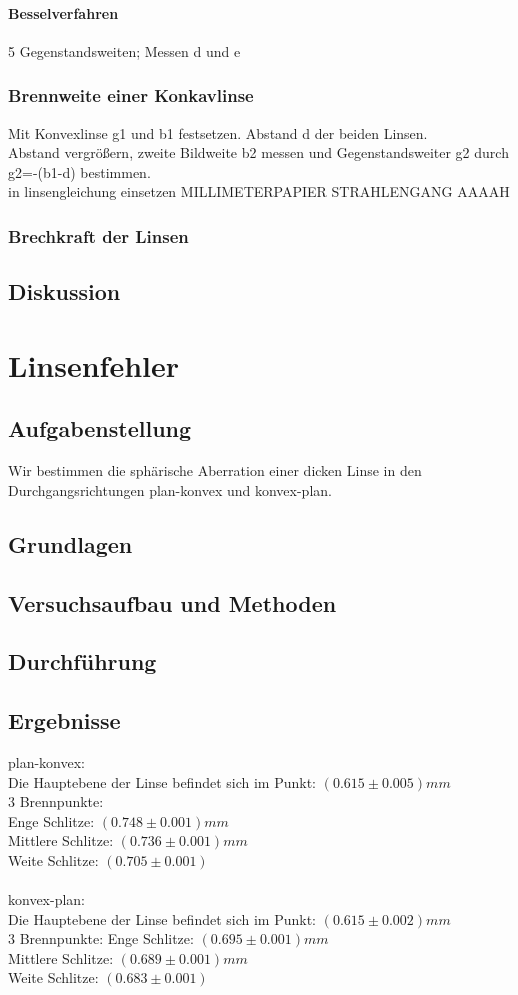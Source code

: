 \documentclass{article}
\begin{document}
\paragraph{Besselverfahren}
5 Gegenstandsweiten; Messen d und e
\subsubsection*{Brennweite einer Konkavlinse}
Mit Konvexlinse g1 und b1 festsetzen. Abstand d der beiden Linsen. \\
Abstand vergrößern, zweite Bildweite b2 messen und Gegenstandsweiter g2 durch g2=-(b1-d) bestimmen.\\
in linsengleichung einsetzen
MILLIMETERPAPIER STRAHLENGANG AAAAH
\subsubsection*{Brechkraft der Linsen}
\subsection{Diskussion}

\section{Linsenfehler}

\subsection{Aufgabenstellung}
Wir bestimmen die sphärische Aberration einer dicken Linse in den Durchgangsrichtungen plan-konvex und konvex-plan.
\subsection{Grundlagen}
\subsection{Versuchsaufbau und Methoden}
\subsection{Durchführung}
\subsection{Ergebnisse}
plan-konvex:\\
Die Hauptebene der Linse befindet sich im Punkt: $(0.615 \pm 0.005)mm$\\
3 Brennpunkte:\\
Enge Schlitze: $(0.748 \pm 0.001)mm$\\
Mittlere Schlitze: $(0.736 \pm 0.001)mm$\\
Weite Schlitze: $(0.705 \pm 0.001)$\\
\\
konvex-plan:\\
Die Hauptebene der Linse befindet sich im Punkt: $(0.615 \pm 0.002)mm$\\
3 Brennpunkte:
Enge Schlitze: $(0.695 \pm 0.001)mm$\\
Mittlere Schlitze: $(0.689 \pm 0.001)mm$\\
Weite Schlitze: $(0.683 \pm 0.001)$\\
\end{document}
